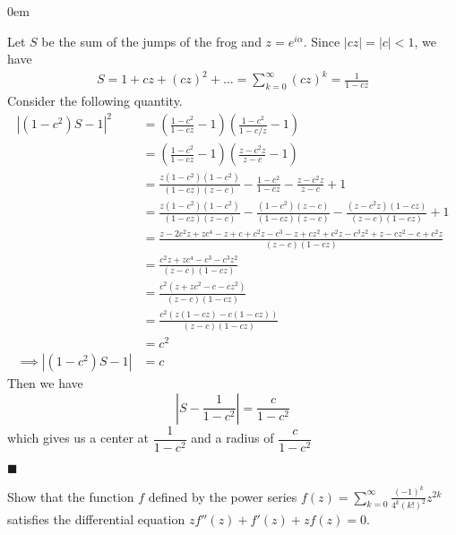 \documentclass[12pt]{article}
\renewcommand{\qed}{\hfill$\blacksquare$}
\renewenvironment{proof}{\vspace{1em}\begin{addmargin}[2em]{0em}\begin{newproof}}{\end{newproof}\end{addmargin}\qed}
\newenvironment{problem}[2][Problem]{\begin{trivlist}
\item[\hskip \labelsep {\bfseries #1} \hskip \labelsep {\bfseries #2.}]}{\end{trivlist}}
\begin{document}
\begin{proof}
	Let $S$ be the sum of the jumps of the frog and $z = e^{i\alpha}$. Since $|cz| = |c| < 1$, we have
	\begin{align*}
		S = 1 + cz + (cz)^2 + \ldots = \sum_{k=0}^{\infty} (cz)^{k} = \frac{1}{1 - cz}
	\end{align*}
	Consider the following quantity.
	\begin{align*}
		|(1 - c^2)S - 1|^2 &= \left(\frac{1 - c^2}{1 - cz} - 1\right)\left(\frac{1 - c^2}{1 - c/z} - 1\right) \\
				   &= \left(\frac{1 - c^2}{1 - cz} - 1\right)\left(\frac{z - c^2z}{z - c} - 1\right) \\
				   &= \frac{z(1 - c^2)(1 - c^2)}{(1 - cz)(z - c)} - \frac{1 - c^2}{1 - cz} - \frac{z - c^2z}{z - c} + 1 \\
				   &= \frac{z(1 - c^2)(1 - c^2)}{(1 - cz)(z - c)} - \frac{(1 - c^2)(z - c)}{(1 - cz)(z - c)} - \frac{(z - c^2z)(1 - cz)}{(z - c)(1 - cz)} + 1 \\
				   &= \frac{z - 2c^2z + zc^4 - z + c + c^2z - c^3 - z + cz^2 +c^2z - c^3z^2 + z - cz^2 - c + c^2z}{(z - c)(1 - cz)} \\
				   &= \frac{c^2z + zc^4 - c^3 - c^3z^2}{(z - c)(1 - cz)} \\
				   &= \frac{c^2(z + zc^2 - c - cz^2)}{(z - c)(1 - cz)} \\
				   &= \frac{c^2(z(1 - cz) - c(1 - cz))}{(z - c)(1 - cz)} \\
				   &= c^2 \\
		\implies |(1 - c^2)S - 1| &= c
	\end{align*}
	Then we have
	\[
		\left|S - \frac{1}{1 - c^2}\right| = \frac{c}{1 - c^2}
	\]
	which gives us a center at $\dfrac{1}{1 - c^2}$ and a radius of $\dfrac{c}{1 - c^2}$
\end{proof}
\begin{problem}{3}
	Show that the function $f$ defined by the power series $f(z) = \sum\limits_{k=0}^{\infty}\frac{(-1)^k}{4^k(k!)^2}z^{2k}$ satisfies the differential equation $zf''(z) + f'(z) + zf(z) = 0$.
\end{problem}
\end{document}
